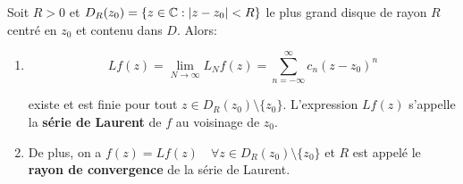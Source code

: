 \begin{result}
    Soit $R > 0$ et $D_R(z_0) = \{ z \in \mathbb{C} : \left|z - z_0\right| < R \}$ le plus grand disque de rayon $R$ centré en $z_0$ et contenu dans $D$.
    Alors:
    
    \begin{enumerate}[label=\arabic{enumi})]
        \item 
        \[ Lf(z) = \lim_{N \rightarrow \infty} L_N f(z) = \sum_{n = -\infty}^\infty c_n (z - z_0)^n \]
        
        existe et est finie pour tout $z \in D_R(z_0) \setminus \{z_0\}$.
        L'expression $Lf(z)$ s'appelle la \textbf{série de Laurent} de $f$ au voisinage de $z_0$.
        
        \item 
        De plus, on a $f(z) = Lf(z) \quad \forall z \in D_R(z_0) \setminus \{z_0\}$ et $R$ est appelé le \textbf{rayon de convergence} de la série de Laurent.
    \end{enumerate}
\end{result}

